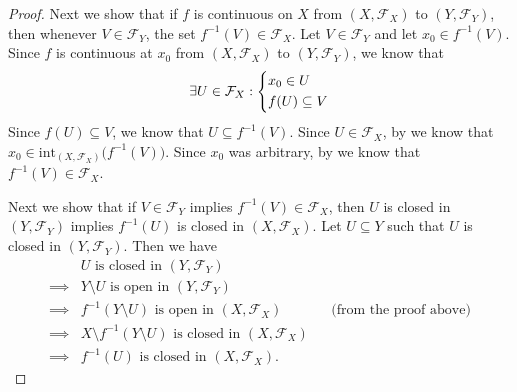 \begin{proof}
  Next we show that if \(f\) is continuous on \(X\) from \((X, \mathcal{F}_X)\) to \((Y, \mathcal{F}_Y)\), then whenever \(V \in \mathcal{F}_Y\), the set \(f^{-1}(V) \in \mathcal{F}_X\).
  Let \(V \in \mathcal{F}_Y\) and let \(x_0 \in f^{-1}(V)\).
  Since \(f\) is continuous at \(x_0\) from \((X, \mathcal{F}_X)\) to \((Y, \mathcal{F}_Y)\), we know that
  \[
    \exists U \in \mathcal{F}_X : \begin{dcases}
      x_0 \in U \\
      f(U) \subseteq V
    \end{dcases}
  \]
  Since \(f(U) \subseteq V\), we know that \(U \subseteq f^{-1}(V)\).
  Since \(U \in \mathcal{F}_X\), by  we know that \(x_0 \in \text{int}_{(X, \mathcal{F}_X)}\big(f^{-1}(V)\big)\).
  Since \(x_0\) was arbitrary, by  we know that \(f^{-1}(V) \in \mathcal{F}_X\).

  Next we show that if \(V \in \mathcal{F}_Y\) implies \(f^{-1}(V) \in \mathcal{F}_X\), then \(U\) is closed in \((Y, \mathcal{F}_Y)\) implies \(f^{-1}(U)\) is closed in \((X, \mathcal{F}_X)\).
  Let \(U \subseteq Y\) such that \(U\) is closed in \((Y, \mathcal{F}_Y)\).
  Then we have
  \begin{align*}
             & U \text{ is closed in } (Y, \mathcal{F}_Y)                                                                    \\
    \implies & Y \setminus U \text{ is open in } (Y, \mathcal{F}_Y)                                                          \\
    \implies & f^{-1}(Y \setminus U) \text{ is open in } (X, \mathcal{F}_X)               &  & \text{(from the proof above)} \\
    \implies & X \setminus f^{-1}(Y \setminus U) \text{ is closed in } (X, \mathcal{F}_X)                                    \\
    \implies & f^{-1}(U) \text{ is closed in } (X, \mathcal{F}_X).
  \end{align*}


\end{proof}
